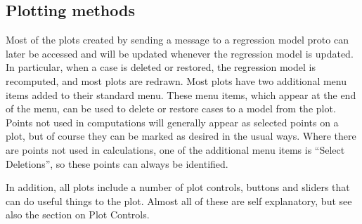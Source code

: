 \subsection{Plotting methods}
Most of the plots created by sending a message to a regression model proto can
later be accessed and will be updated whenever the regression model is
updated.  In particular, when a case is deleted or restored, the regression
model is recomputed, and most plots are redrawn.  Most plots have two
additional menu items added to their standard menu.  These menu items, which
appear at the end of the menu, can be used to delete or restore cases to a
model from the plot.  Points not used in computations will generally appear as
selected points on a plot, but of course they can be marked as desired in the
usual ways.  Where there are points not used in calculations, one of the
additional menu items is ``Select Deletions'', so these points can always be
identified.

In addition, all plots include a number of plot
controls, buttons and sliders that can do useful things to the plot.  Almost
all of these are self explanatory, but see also the section on Plot
Controls.

